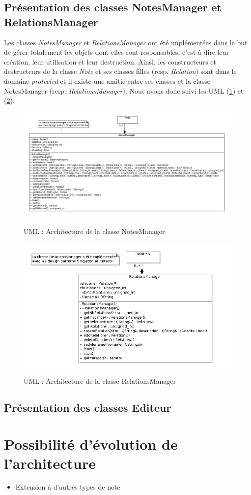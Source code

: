 \documentclass[a4paper,10pt]{report}
\begin{document}
\section{Présentation des classes NotesManager et RelationsManager}
\label{NotesManager & RelationsManager}
Les classes \textit{NotesManager} et \textit{RelationsManager} ont été implémentées dans le but de gérer totalement les objets dont elles sont responsables, c'est à dire leur création, leur utilisation et leur destruction. Ainsi, les constructeurs et destructeurs de la classe \textit{Note} et ses classes filles (resp. \textit{Relation}) sont dans le domaine \textit{protected} et il existe une amitié entre ses classes et la classe NotesManager (resp. \textit{RelationsManager}). Nous avons donc suivi les UML (\ref{UML_notemanager}) et (\ref{UML_relationmanager}).
\begin{center}
\begin{figure}[H]
\caption{UML : Architecture de la classe NotesManager}
\includegraphics[width=\textwidth]{UML_notemanager.png}
\label{UML_notemanager}
\end{figure}
\end{center}

\begin{center}
\begin{figure}[H]
\caption{UML : Architecture de la classe RelationsManager}
\includegraphics[width=\textwidth]{UML_relationmanager.png}
\label{UML_relationmanager}
\end{figure}
\end{center}

\section{Présentation des classes Editeur}

\chapter{Possibilité d'évolution de l'architecture}
\begin{itemize}
\item Extension à d'autres types de note
\end{itemize}
\end{document}
